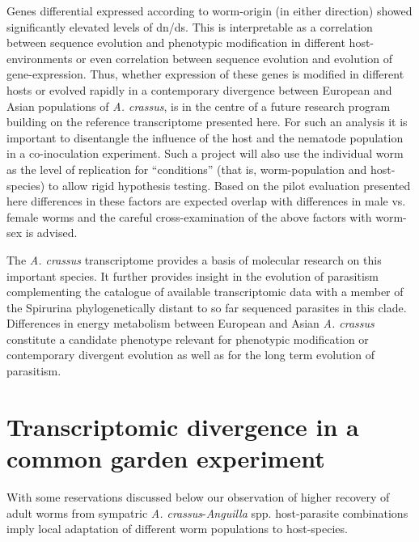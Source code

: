 Genes differential expressed according to worm-origin (in either
direction) showed significantly elevated levels of dn/ds. This is
interpretable as a correlation between sequence evolution and
phenotypic modification in different host-environments or even
correlation between sequence evolution and evolution of
gene-expression. Thus, whether expression of these genes is modified
in different hosts or evolved rapidly in a contemporary divergence
between European and Asian populations of \textit{A. crassus}, is in
the centre of a future research program building on the reference
transcriptome presented here. For such an analysis it is important to
disentangle the influence of the host and the nematode population in a
co-inoculation experiment. Such a project will also use the individual
worm as the level of replication for ``conditions'' (that is,
worm-population and host-species) to allow rigid hypothesis
testing. Based on the pilot evaluation presented here differences in
these factors are expected overlap with differences in male vs. female
worms and the careful cross-examination of the above factors with
worm-sex is advised.

The \textit{A. crassus} transcriptome provides a basis of molecular
research on this important species. It further provides insight in the
evolution of parasitism complementing the catalogue of available
transcriptomic data with a member of the Spirurina phylogenetically
distant to so far sequenced parasites in this clade. Differences in
energy metabolism between European and Asian \textit{A. crassus}
constitute a candidate phenotype relevant for phenotypic modification
or contemporary divergent evolution as well as for the long term
evolution of parasitism.

\newpage

\section{Transcriptomic divergence in a common garden experiment}
\label{sec:exp-inf}

With some reservations discussed below our observation of higher
recovery of adult worms from sympatric
\textit{A. crassus}-\textit{Anguilla} spp. host-parasite combinations
imply local adaptation of different worm populations to host-species.

